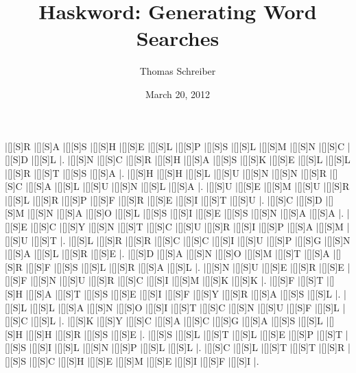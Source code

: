 \documentclass[12pt]{report}   %
\begin{document}
\title{Haskword: Generating Word Searches}   %
\author{Thomas Schreiber}         %
\date{March 20, 2012}    %

\begin{minipage}[h]{\textwidth}
  \maketitle

  \vspace{12pt}

  \begin{Puzzle}{14}{14}%
        |[][S]R |[][S]A |[][S]S |[][S]H |[][S]E |[][S]L |[][S]P |[][S]S |[][S]L |[][S]M |[][S]N |[][S]C |[][S]D |[][S]L |.
        |[][S]N |[][S]C |[][S]R |[][S]H |[][S]A |[][S]S |[][S]K |[][S]E |[][S]L |[][S]L |[][S]R |[][S]T |[][S]S |[][S]A |.
        |[][S]H |[][S]H |[][S]L |[][S]U |[][S]N |[][S]N |[][S]R |[][S]C |[][S]A |[][S]L |[][S]U |[][S]N |[][S]L |[][S]A |.
        |[][S]U |[][S]E |[][S]M |[][S]U |[][S]R |[][S]L |[][S]R |[][S]P |[][S]F |[][S]R |[][S]E |[][S]I |[][S]T |[][S]U |.
        |[][S]C |[][S]D |[][S]M |[][S]N |[][S]A |[][S]O |[][S]L |[][S]S |[][S]I |[][S]E |[][S]S |[][S]N |[][S]A |[][S]A |.
        |[][S]E |[][S]C |[][S]Y |[][S]N |[][S]T |[][S]C |[][S]U |[][S]R |[][S]I |[][S]P |[][S]A |[][S]M |[][S]U |[][S]T |.
        |[][S]L |[][S]R |[][S]R |[][S]C |[][S]C |[][S]I |[][S]U |[][S]P |[][S]G |[][S]N |[][S]A |[][S]L |[][S]R |[][S]E |.
        |[][S]D |[][S]A |[][S]N |[][S]O |[][S]M |[][S]T |[][S]A |[][S]R |[][S]F |[][S]S |[][S]L |[][S]R |[][S]A |[][S]L |.
        |[][S]N |[][S]U |[][S]E |[][S]R |[][S]E |[][S]F |[][S]N |[][S]U |[][S]R |[][S]C |[][S]I |[][S]M |[][S]K |[][S]K |.
        |[][S]F |[][S]T |[][S]H |[][S]A |[][S]T |[][S]S |[][S]E |[][S]I |[][S]F |[][S]Y |[][S]R |[][S]A |[][S]S |[][S]L |.
        |[][S]L |[][S]L |[][S]A |[][S]N |[][S]O |[][S]I |[][S]T |[][S]C |[][S]N |[][S]U |[][S]F |[][S]L |[][S]C |[][S]L |.
        |[][S]K |[][S]Y |[][S]C |[][S]A |[][S]C |[][S]G |[][S]A |[][S]S |[][S]L |[][S]H |[][S]H |[][S]R |[][S]S |[][S]E |.
        |[][S]S |[][S]L |[][S]T |[][S]L |[][S]E |[][S]P |[][S]T |[][S]S |[][S]I |[][S]L |[][S]N |[][S]P |[][S]L |[][S]L |.
        |[][S]C |[][S]L |[][S]T |[][S]T |[][S]R |[][S]S |[][S]C |[][S]H |[][S]E |[][S]M |[][S]E |[][S]I |[][S]F |[][S]I |.
  \end{Puzzle}
\end{minipage}
\end{document}
